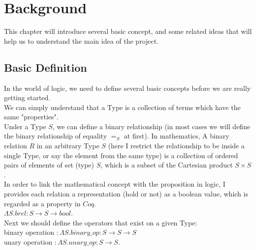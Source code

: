 \documentclass[a4paper,12pt,twoside,openright]{report}
\begin{document}
\chapter{Background} 

%

This chapter will introduce several basic concept, and some related ideas that will help us to understand the main idea of the project.

\section{Basic Definition}
In the world of logic, we need to define several basic concepts before we are really getting started.\\
We can simply understand that a Type is a collection of terms which have the same "properties". \\
Under a Type $S$, we can define a binary relationship  (in most cases we will define the binary relationship of equality $=_S$ at first).
In mathematics, A binary relation $R$ in an arbitrary Type $S$ (here I restrict the relationship to be inside a single Type, or say the element from the same type) is a collection of ordered pairs of elements of set (type) $S$, which is a subset of the Cartesian product $S \times S$. \\
In order to link the mathematical concept with the proposition in logic, I provides each relation a representation (hold or not) as a boolean value, which is regarded as a property in $Coq$. \\
$\Lambda S. brel : S \rightarrow S \rightarrow bool$. \\
Next we should define the operators that exist on a given Type:\\
binary operation $: \Lambda S.binary\_op :S \rightarrow S \rightarrow S$\\
unary operation $: \Lambda S.unary\_op:S \rightarrow S$. \\
\end{document}
